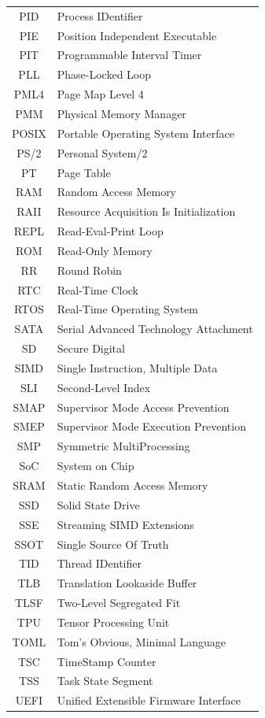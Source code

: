\documentclass[a4paper,10pt,twoside]{report}
\theoremstyle{definition}
\begin{document}
\begin{supertabular}{cl}
PID & Process IDentifier \\
PIE & Position Independent Executable \\
PIT & Programmable Interval Timer \\
PLL & Phase-Locked Loop \\
PML4 & Page Map Level 4 \\
PMM & Physical Memory Manager \\
POSIX & Portable Operating System Interface \\
PS/2 & Personal System/2 \\
PT & Page Table \\
RAM & Random Access Memory \\
RAII & Resource Acquisition Is Initialization \\
REPL & Read-Eval-Print Loop \\
ROM & Read-Only Memory \\
RR & Round Robin \\
RTC & Real-Time Clock \\
RTOS & Real-Time Operating System \\
SATA & Serial Advanced Technology Attachment \\
SD & Secure Digital \\
SIMD & Single Instruction, Multiple Data \\
SLI & Second-Level Index \\
SMAP & Supervisor Mode Access Prevention \\
SMEP & Supervisor Mode Execution Prevention \\
SMP & Symmetric MultiProcessing \\
SoC & System on Chip \\
SRAM & Static Random Access Memory \\
SSD & Solid State Drive \\
SSE & Streaming SIMD Extensions \\
SSOT & Single Source Of Truth \\
TID & Thread IDentifier \\
TLB & Translation Lookaside Buffer \\
TLSF & Two-Level Segregated Fit \\
TPU & Tensor Processing Unit \\
TOML & Tom's Obvious, Minimal Language \\
TSC & TimeStamp Counter \\
TSS & Task State Segment \\
UEFI & Unified Extensible Firmware Interface \\

\end{supertabular}
\end{document}
